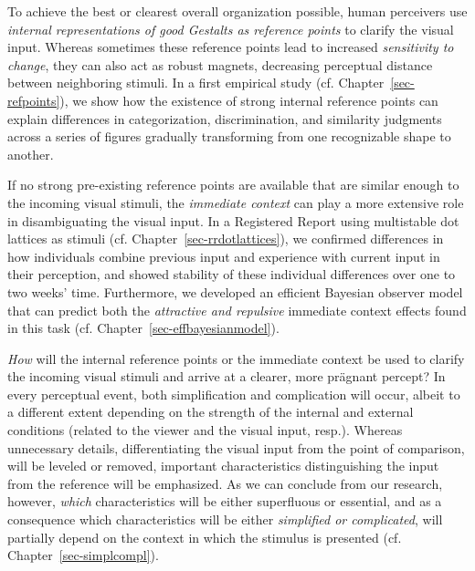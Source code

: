 To achieve the best or clearest overall organization possible, human perceivers use \textit{internal representations of good Gestalts as reference points} to clarify the visual input. Whereas sometimes these reference points lead to increased \textit{sensitivity to change}, they can also act as robust magnets, decreasing perceptual distance between neighboring stimuli. In a first empirical study (cf. Chapter~\ref{sec-refpoints}), we show how the existence of strong internal reference points can explain differences in categorization, discrimination, and similarity judgments across a series of figures gradually transforming from one recognizable shape to another. 

If no strong pre-existing reference points are available that are similar enough to the incoming visual stimuli, the \textit{immediate context} can play a more extensive role in disambiguating the visual input. In a Registered Report using multistable dot lattices as stimuli (cf. Chapter~\ref{sec-rrdotlattices}), we confirmed differences in how individuals combine previous input and experience with current input in their perception, and showed stability of these individual differences over one to two weeks’ time. Furthermore, we developed an efficient Bayesian observer model that can predict both the \textit{attractive and repulsive} immediate context effects found in this task (cf. Chapter~\ref{sec-effbayesianmodel}).

\textit{How} will the internal reference points or the immediate context be used to clarify the incoming visual stimuli and arrive at a clearer, more prägnant percept? In every perceptual event, both simplification and complication will occur, albeit to a different extent depending on the strength of the internal and external conditions (related to the viewer and the visual input, resp.). Whereas unnecessary details, differentiating the visual input from the point of comparison, will be leveled or removed, important characteristics distinguishing the input from the reference will be emphasized. As we can conclude from our research, however, \textit{which} characteristics will be either superfluous or essential, and as a consequence which characteristics will be either \textit{simplified or complicated}, will partially depend on the context in which the stimulus is presented (cf. Chapter~\ref{sec-simplcompl}).

